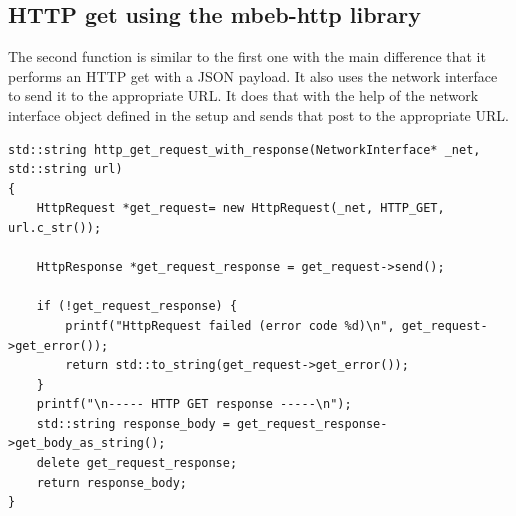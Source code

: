 \subsection{HTTP get using the mbeb-http library}
The second function is similar to the first one with the main difference that it performs an HTTP get with a JSON payload.
It also uses the network interface to send it to the appropriate URL.
It does that with the help of the network interface object defined in the setup and sends that post to the appropriate URL.
\begin{lstlisting}[style=CStyle]
std::string http_get_request_with_response(NetworkInterface* _net, std::string url)
{
    HttpRequest *get_request= new HttpRequest(_net, HTTP_GET, url.c_str());

    HttpResponse *get_request_response = get_request->send();

    if (!get_request_response) {
        printf("HttpRequest failed (error code %d)\n", get_request->get_error());
        return std::to_string(get_request->get_error());
    }
    printf("\n----- HTTP GET response -----\n");
    std::string response_body = get_request_response->get_body_as_string();
    delete get_request_response;
    return response_body;
}
\end{lstlisting}
